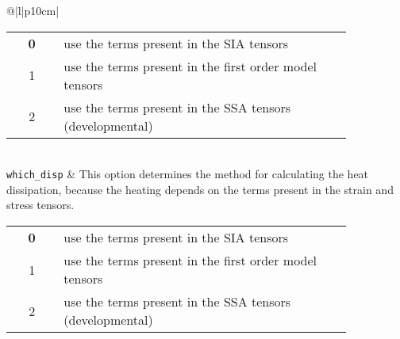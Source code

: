 \begin{center}
\begin{supertabular*}{\textwidth}{@{\extracolsep{\fill}}|l|p{10cm}|}
\begin{tabular}[t]{cp{0.85\linewidth}}
      {\bf 0} & use the terms present in the SIA tensors \\
      1 & use the terms present in the first order model tensors \\
      2 & use the terms present in the SSA tensors (developmental)\\
    \end{tabular}\\  
    \hline
    \texttt{which\_disp} & 
    This option determines the method for calculating the heat dissipation,
    because the heating depends on the terms present in the strain and stress
    tensors.
    \begin{tabular}[t]{cp{0.85\linewidth}}
      {\bf 0} & use the terms present in the SIA tensors\\
      1 & use the terms present in the first order model tensors\\
      2 & use the terms present in the SSA tensors (developmental)\\
    \end{tabular}\\  



\end{supertabular*}
\end{center}
